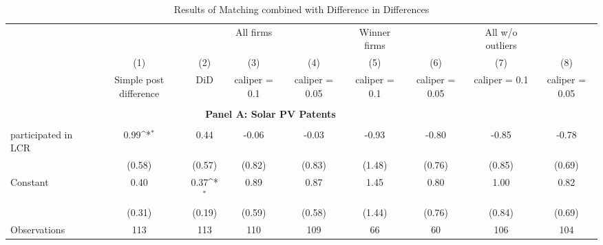 \begin{table}[htbp]\centering \\  \def\sym#1{\ifmmode^{#1}\else\(^{#1}\)\fi} \\ \caption{Results of Matching combined with Difference in Differences} \\ \begin{tabular}{l*{8}{c}} \hline\hline
                    &                     &                     &   All firms         &                     &Winner firms         &                     &All w/o outliers         &                     \\
                    &\multicolumn{1}{c}{(1)}&\multicolumn{1}{c}{(2)}&\multicolumn{1}{c}{(3)}&\multicolumn{1}{c}{(4)}&\multicolumn{1}{c}{(5)}&\multicolumn{1}{c}{(6)}&\multicolumn{1}{c}{(7)}&\multicolumn{1}{c}{(8)}\\
                    &\multicolumn{1}{c}{Simple post difference}&\multicolumn{1}{c}{DiD}&\multicolumn{1}{c}{caliper = 0.1}&\multicolumn{1}{c}{caliper = 0.05}&\multicolumn{1}{c}{caliper = 0.1}&\multicolumn{1}{c}{caliper = 0.05}&\multicolumn{1}{c}{caliper = 0.1}&\multicolumn{1}{c}{caliper = 0.05}\\
\hline \\ \multicolumn{8}{c}{\textbf{Panel A: Solar PV Patents}} \\\\[-1ex]
participated in LCR &        0.99\sym{*}  &        0.44         &       -0.06         &       -0.03         &       -0.93         &       -0.80         &       -0.85         &       -0.78         \\
                    &      (0.58)         &      (0.57)         &      (0.82)         &      (0.83)         &      (1.48)         &      (0.76)         &      (0.85)         &      (0.69)         \\
[1em]
Constant            &        0.40         &        0.37\sym{*}  &        0.89         &        0.87         &        1.45         &        0.80         &        1.00         &        0.82         \\
                    &      (0.31)         &      (0.19)         &      (0.59)         &      (0.58)         &      (1.44)         &      (0.76)         &      (0.84)         &      (0.69)         \\
\hline
Observations        &         113         &         113         &         110         &         109         &          66         &          60         &         106         &         104         \\

\end{tabular}
\end{table}
